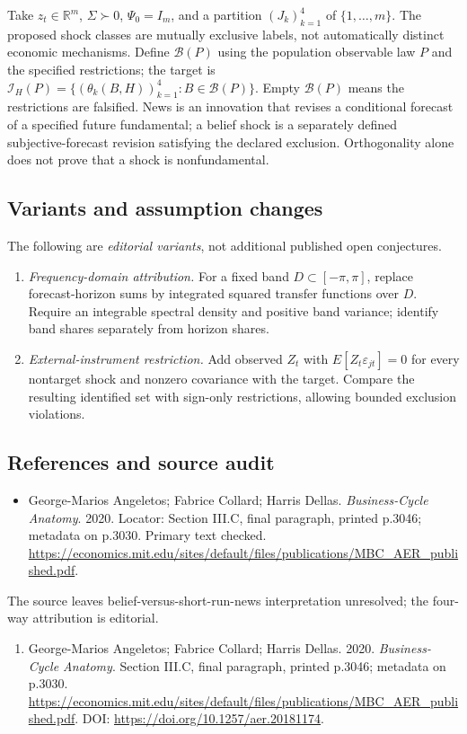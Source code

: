 \documentclass[11pt,a4paper]{article}
\begin{document}
Take \(z_t\in\mathbb R^m\), \(\Sigma\succ0\), \(\Psi_0=I_m\), and a partition \((J_k)_{k=1}^4\) of \(\{1,\ldots,m\}\). The proposed shock classes are mutually exclusive labels, not automatically distinct economic mechanisms. Define \(\mathcal B(P)\) using the population observable law \(P\) and the specified restrictions; the target is \(\mathcal I_H(P)=\{(\theta_k(B,H))_{k=1}^4:B\in\mathcal B(P)\}\). Empty \(\mathcal B(P)\) means the restrictions are falsified. News is an innovation that revises a conditional forecast of a specified future fundamental; a belief shock is a separately defined subjective-forecast revision satisfying the declared exclusion. Orthogonality alone does not prove that a shock is nonfundamental.
\subsection*{Variants and assumption changes}
The following are \emph{editorial variants}, not additional published open conjectures.
\begin{enumerate}
\item \emph{Frequency-domain attribution.} For a fixed band \(D\subset[-\pi,\pi]\), replace forecast-horizon sums by integrated squared transfer functions over \(D\). Require an integrable spectral density and positive band variance; identify band shares separately from horizon shares.
\item \emph{External-instrument restriction.} Add observed \(Z_t\) with \(E[Z_t\varepsilon_{jt}]=0\) for every nontarget shock and nonzero covariance with the target. Compare the resulting identified set with sign-only restrictions, allowing bounded exclusion violations.
\end{enumerate}
\subsection*{References and source audit}
\begin{itemize}
\item George-Marios Angeletos; Fabrice Collard; Harris Dellas. \emph{Business-Cycle Anatomy}. 2020. Locator: Section III.C, final paragraph, printed p.3046; metadata on p.3030. Primary text checked. \url{https://economics.mit.edu/sites/default/files/publications/MBC_AER_published.pdf}.
\end{itemize}
The source leaves belief-versus-short-run-news interpretation unresolved; the four-way attribution is editorial.
\begin{enumerate}\raggedright
\item\hypertarget{definitions:source:30007512:1}{} George-Marios Angeletos; Fabrice Collard; Harris Dellas. 2020. \emph{Business-Cycle Anatomy}. Section III.C, final paragraph, printed p.3046; metadata on p.3030.
\url{https://economics.mit.edu/sites/default/files/publications/MBC_AER_published.pdf}.
DOI: \url{https://doi.org/10.1257/aer.20181174}.
\end{enumerate}
\end{document}
